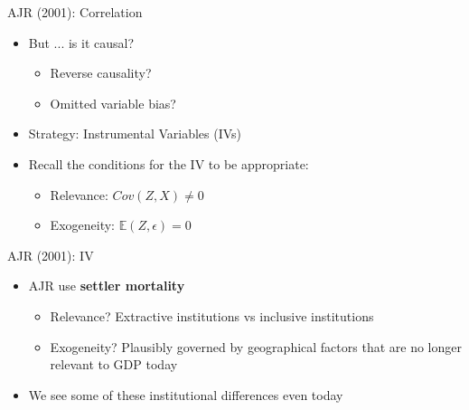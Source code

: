 \documentclass[11pt,notes=hide,aspectratio=169,mathserif]{beamer}
\begin{document}
\begin{frame}{AJR (2001): Correlation}
\begin{itemize}
\item But ... is it causal? 
\begin{itemize}
    \item Reverse causality?
    \item Omitted variable bias?
\end{itemize}
\item Strategy: Instrumental Variables (IVs)
\item Recall the conditions for the IV to be appropriate:
\begin{itemize}
    \item Relevance: $Cov(Z, X) \neq 0$
    \item Exogeneity: $\mathbb{E}(Z, \epsilon) = 0$
\end{itemize}
\end{itemize}
\end{frame}

\begin{frame}{AJR (2001): IV}
\begin{itemize}
\item AJR use \textbf{settler mortality}
\begin{itemize}
    \item Relevance? Extractive institutions vs inclusive institutions
    \item Exogeneity? Plausibly governed by geographical factors that are no longer relevant to GDP today
\end{itemize}
\item We see some of these institutional differences even today
\end{itemize}
\end{frame}
\end{document}
